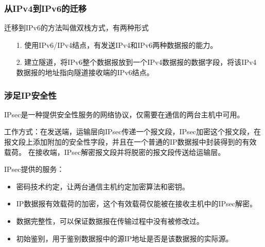 \documentclass[a4paper,left=2.5cm,right=2.5cm,11pt]{article}
\begin{document}
\subsubsection{从IPv4到IPv6的迁移}
	迁移到IPv6的方法叫做双栈方式，有两种形式
	\begin{itemize}
		\item[1.] 使用IPv6/IPv4结点，有发送IPv4和IPv6两种数据报的能力。
		\item[2.] 建立隧道，将IPv6整个数据报放到一个IPv4数据报的数据字段，将该IPv4数据报的地址指向隧道接收端的IPv6结点。
	\end{itemize}

\subsubsection{涉足IP安全性}
	IPsec是一种提供安全性服务的网络协议，仅需要在通信的两台主机中可用。\par

	工作方式：在发送端，运输层向IPsec传递一个报文段，IPsec加密这个报文段，在报文段上添加附加的安全性字段，并且在一个普通的IP数据报中封装得到的有效载荷。
	在接收端，IPsec解密报文段并将脱密的报文段传送给运输层。\par

	IPsec提供的服务：
	\begin{itemize}
		\item 密码技术约定，让两台通信主机约定加密算法和密钥。
		\item IP数据报有效载荷的加密，这个有效载荷仅能被在接收主机中的IPsec解密。
		\item 数据完整性，可以保证数据报在传输过程中没有被修改过。
		\item 初始鉴别，用于鉴别数据报中的源IP地址是否是该数据报的实际源。
	\end{itemize}
\end{document}
